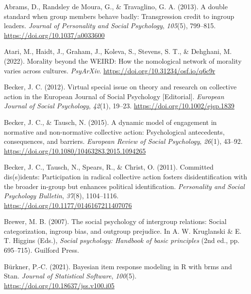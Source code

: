 \documentclass[12pt, letterpaper]{article}
\newenvironment{CSLReferences}[2]{}{}
\begin{document}
\hypertarget{refs}{}
\begin{CSLReferences}{1}{0}
\leavevmode{}%
Abrams, D., Randsley de Moura, G., \& Travaglino, G. A. (2013). A double
standard when group members behave badly: {Transgression} credit to
ingroup leaders. \emph{Journal of Personality and Social Psychology},
\emph{105}(5), 799--815. \url{https://doi.org/10.1037/a0033600}

\leavevmode{}%
Atari, M., Haidt, J., Graham, J., Koleva, S., Stevens, S. T., \&
Dehghani, M. (2022). Morality beyond the {WEIRD}: How the nomological
network of morality varies across cultures. \emph{PsyArXiv}.
\url{https://doi.org/10.31234/osf.io/q6c9r}

\leavevmode{}%
Becker, J. C. (2012). Virtual special issue on theory and research on
collective action in the {European} {Journal} of {Social} {Psychology}
{[}{Editorial}{]}. \emph{European Journal of Social Psychology},
\emph{42}(1), 19--23. \url{https://doi.org/10.1002/ejsp.1839}

\leavevmode{}%
Becker, J. C., \& Tausch, N. (2015). A dynamic model of engagement in
normative and non-normative collective action: {Psychological}
antecedents, consequences, and barriers. \emph{European Review of Social
Psychology}, \emph{26}(1), 43--92.
\url{https://doi.org/10.1080/10463283.2015.1094265}

\leavevmode{}%
Becker, J. C., Tausch, N., Spears, R., \& Christ, O. (2011). Committed
dis(s)idents: {Participation} in radical collective action fosters
disidentification with the broader in-group but enhances political
identification. \emph{Personality and Social Psychology Bulletin},
\emph{37}(8), 1104--1116. \url{https://doi.org/10.1177/0146167211407076}

\leavevmode{}%
Brewer, M. B. (2007). The social psychology of intergroup relations:
Social categorization, ingroup bias, and outgroup prejudice. In A. W.
Kruglanski \& E. T. Higgins (Eds.), \emph{Social psychology: Handbook of
basic principles} (2nd ed., pp. 695--715). Guilford Press.

\leavevmode{}%
Bürkner, P.-C. (2021). Bayesian item response modeling in {R} with brms
and {Stan}. \emph{Journal of Statistical Software}, \emph{100}(5).
\url{https://doi.org/10.18637/jss.v100.i05}


\end{CSLReferences}
\end{document}
